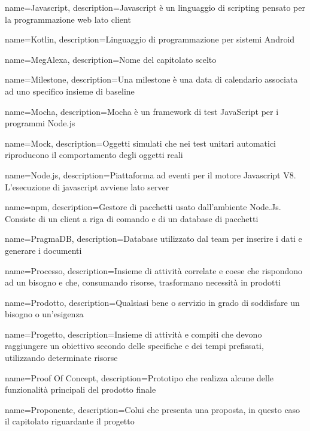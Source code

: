 {
	name={Javascript},
	description={Javascript è un linguaggio di scripting pensato per la programmazione web lato client}
}

{
	name={Kotlin},
	description={Linguaggio di programmazione per sistemi Android}
}

{
	name={MegAlexa},
	description={Nome del capitolato scelto}
}

{
	name={Milestone},
	description={Una milestone è una data di calendario associata ad uno specifico insieme di baseline}
}

{
	name={Mocha},
	description={Mocha è un framework di test JavaScript per i programmi Node.js}
}

{
	name={Mock},
	description={Oggetti simulati che nei test unitari automatici riproducono il comportamento degli oggetti reali}
}

{
	name={Node.js},
	description={Piattaforma ad eventi per il motore Javascript V8. L’esecuzione di javascript avviene lato server}
}

{
	name={npm},
	description={Gestore di pacchetti usato dall'ambiente Node.Js. Consiste di un client a riga di comando e di un database di pacchetti}
}

{
	name={PragmaDB},
	description={Database utilizzato dal team per inserire i dati e generare i documenti}
}

{
	name={Processo},
	description={Insieme di attività correlate e coese che rispondono ad un bisogno e che, consumando risorse, trasformano necessità in prodotti}
}

{
	name={Prodotto},
	description={Qualsiasi bene o servizio in grado di soddisfare un bisogno o un’esigenza}
}

{
	name={Progetto},
	description={Insieme di attività e compiti che devono raggiungere un obiettivo secondo delle specifiche e dei tempi prefissati, utilizzando determinate risorse}
}

{
	name={Proof Of Concept},
	description={Prototipo che realizza alcune delle funzionalità principali del prodotto finale}
}

{
	name={Proponente},
	description={Colui che presenta una proposta, in questo caso il capitolato riguardante il progetto}
}

